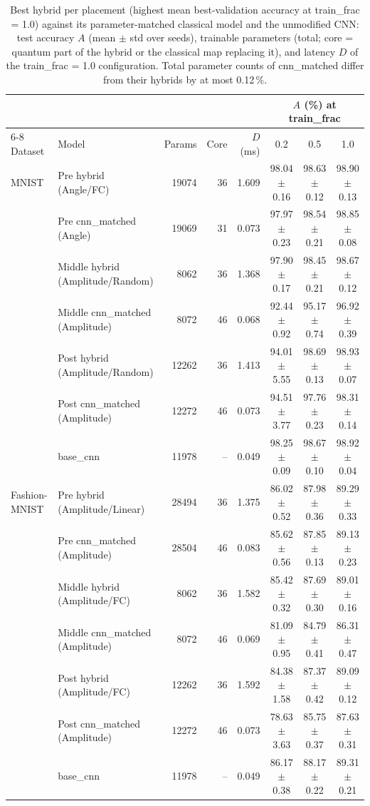 \begin{table}[!t]
\centering
\caption{Best hybrid per placement (highest mean best-validation accuracy at train\_frac = 1.0) against its parameter-matched classical model and the unmodified CNN: test accuracy $A$ (mean $\pm$ std over seeds), trainable parameters (total; core = quantum part of the hybrid or the classical map replacing it), and latency $D$ of the train\_frac = 1.0 configuration. Total parameter counts of cnn\_matched differ from their hybrids by at most 0.12\,\%.}
\label{tab:baselines}
\footnotesize
\begin{tabular}{llrrrccc}
\toprule
 &  &  &  &  & \multicolumn{3}{c}{$A$ (\%) at train\_frac} \\
\cmidrule(lr){6-8}
Dataset & Model & Params & Core & $D$ (ms) & 0.2 & 0.5 & 1.0 \\
\midrule
MNIST & Pre hybrid (Angle/FC) & 19074 & 36 & 1.609 & 98.04 $\pm$ 0.16 & 98.63 $\pm$ 0.12 & 98.90 $\pm$ 0.13 \\
 & Pre cnn\_matched (Angle) & 19069 & 31 & 0.073 & 97.97 $\pm$ 0.23 & 98.54 $\pm$ 0.21 & 98.85 $\pm$ 0.08 \\
 & Middle hybrid (Amplitude/Random) & 8062 & 36 & 1.368 & 97.90 $\pm$ 0.17 & 98.45 $\pm$ 0.21 & 98.67 $\pm$ 0.12 \\
 & Middle cnn\_matched (Amplitude) & 8072 & 46 & 0.068 & 92.44 $\pm$ 0.92 & 95.17 $\pm$ 0.74 & 96.92 $\pm$ 0.39 \\
 & Post hybrid (Amplitude/Random) & 12262 & 36 & 1.413 & 94.01 $\pm$ 5.55 & 98.69 $\pm$ 0.13 & 98.93 $\pm$ 0.07 \\
 & Post cnn\_matched (Amplitude) & 12272 & 46 & 0.073 & 94.51 $\pm$ 3.77 & 97.76 $\pm$ 0.23 & 98.31 $\pm$ 0.14 \\
 & base\_cnn & 11978 & -- & 0.049 & 98.25 $\pm$ 0.09 & 98.67 $\pm$ 0.10 & 98.92 $\pm$ 0.04 \\
\midrule
Fashion-MNIST & Pre hybrid (Amplitude/Linear) & 28494 & 36 & 1.375 & 86.02 $\pm$ 0.52 & 87.98 $\pm$ 0.36 & 89.29 $\pm$ 0.33 \\
 & Pre cnn\_matched (Amplitude) & 28504 & 46 & 0.083 & 85.62 $\pm$ 0.56 & 87.85 $\pm$ 0.13 & 89.13 $\pm$ 0.23 \\
 & Middle hybrid (Amplitude/FC) & 8062 & 36 & 1.582 & 85.42 $\pm$ 0.32 & 87.69 $\pm$ 0.30 & 89.01 $\pm$ 0.16 \\
 & Middle cnn\_matched (Amplitude) & 8072 & 46 & 0.069 & 81.09 $\pm$ 0.95 & 84.79 $\pm$ 0.41 & 86.31 $\pm$ 0.47 \\
 & Post hybrid (Amplitude/FC) & 12262 & 36 & 1.592 & 84.38 $\pm$ 1.58 & 87.37 $\pm$ 0.42 & 89.09 $\pm$ 0.12 \\
 & Post cnn\_matched (Amplitude) & 12272 & 46 & 0.073 & 78.63 $\pm$ 3.63 & 85.75 $\pm$ 0.37 & 87.63 $\pm$ 0.31 \\
 & base\_cnn & 11978 & -- & 0.049 & 86.17 $\pm$ 0.38 & 88.17 $\pm$ 0.22 & 89.31 $\pm$ 0.21 \\
\bottomrule
\end{tabular}
\end{table}
